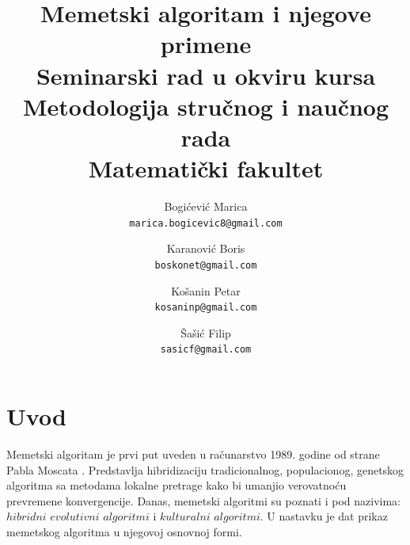 \documentclass[a4paper]{article}
\begin{document}
\title{Memetski algoritam i njegove primene\\ \small{Seminarski rad u okviru kursa\\Metodologija stručnog i naučnog rada\\ Matematički fakultet}}


\author{
  Bogićević Marica\\
  \texttt{marica.bogicevic8@gmail.com}
  \and
  Karanović Boris\\
  \texttt{boskonet@gmail.com}
    \and
  Košanin Petar\\
  \texttt{kosaninp@gmail.com}
    \and
  Šašić Filip\\
  \texttt{sasicf@gmail.com}
}


\maketitle


\tableofcontents

\newpage

\section{Uvod}
\label{sec:uvod}

Memetski algoritam je prvi put uveden u računarstvo 1989. godine od strane Pabla Moscata \cite{towardsmemetic}. Predstavlja hibridizaciju tradicionalnog, populacionog, genetskog algoritma sa metodama lokalne pretrage kako bi umanjio verovatnoću prevremene konvergencije. Danas, memetski algoritmi su poznati i pod nazivima: $hibridni$ $evolutivni$ $algoritmi$ i $kulturalni$ $algoritmi$. U nastavku je dat prikaz memetskog algoritma u njegovoj osnovnoj formi.
\end{document}
